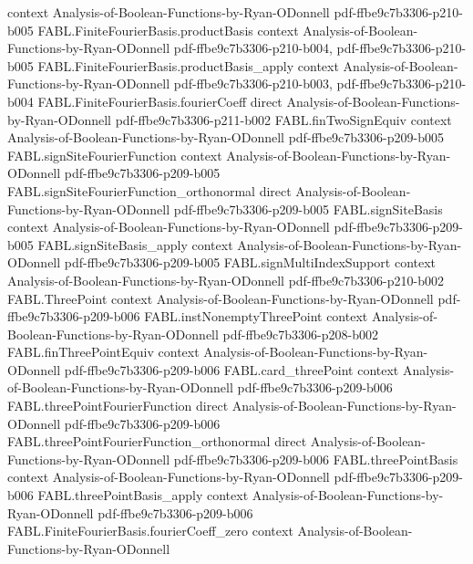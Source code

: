 \begin{theorem}
  {context}
  {Analysis-of-Boolean-Functions-by-Ryan-ODonnell}
  {pdf-ffbe9c7b3306-p210-b005}
\proofstep
  {FABL.FiniteFourierBasis.productBasis}
  {context}
  {Analysis-of-Boolean-Functions-by-Ryan-ODonnell}
  {pdf-ffbe9c7b3306-p210-b004,
    pdf-ffbe9c7b3306-p210-b005}
\proofstep
  {FABL.FiniteFourierBasis.productBasis_apply}
  {context}
  {Analysis-of-Boolean-Functions-by-Ryan-ODonnell}
  {pdf-ffbe9c7b3306-p210-b003,
    pdf-ffbe9c7b3306-p210-b004}
\proofstep
  {FABL.FiniteFourierBasis.fourierCoeff}
  {direct}
  {Analysis-of-Boolean-Functions-by-Ryan-ODonnell}
  {pdf-ffbe9c7b3306-p211-b002}
\proofstep
  {FABL.finTwoSignEquiv}
  {context}
  {Analysis-of-Boolean-Functions-by-Ryan-ODonnell}
  {pdf-ffbe9c7b3306-p209-b005}
\proofstep
  {FABL.signSiteFourierFunction}
  {context}
  {Analysis-of-Boolean-Functions-by-Ryan-ODonnell}
  {pdf-ffbe9c7b3306-p209-b005}
\proofstep
  {FABL.signSiteFourierFunction_orthonormal}
  {direct}
  {Analysis-of-Boolean-Functions-by-Ryan-ODonnell}
  {pdf-ffbe9c7b3306-p209-b005}
\proofstep
  {FABL.signSiteBasis}
  {context}
  {Analysis-of-Boolean-Functions-by-Ryan-ODonnell}
  {pdf-ffbe9c7b3306-p209-b005}
\proofstep
  {FABL.signSiteBasis_apply}
  {context}
  {Analysis-of-Boolean-Functions-by-Ryan-ODonnell}
  {pdf-ffbe9c7b3306-p209-b005}
\proofstep
  {FABL.signMultiIndexSupport}
  {context}
  {Analysis-of-Boolean-Functions-by-Ryan-ODonnell}
  {pdf-ffbe9c7b3306-p210-b002}
\proofstep
  {FABL.ThreePoint}
  {context}
  {Analysis-of-Boolean-Functions-by-Ryan-ODonnell}
  {pdf-ffbe9c7b3306-p209-b006}
\proofstep
  {FABL.instNonemptyThreePoint}
  {context}
  {Analysis-of-Boolean-Functions-by-Ryan-ODonnell}
  {pdf-ffbe9c7b3306-p208-b002}
\proofstep
  {FABL.finThreePointEquiv}
  {context}
  {Analysis-of-Boolean-Functions-by-Ryan-ODonnell}
  {pdf-ffbe9c7b3306-p209-b006}
\proofstep
  {FABL.card_threePoint}
  {context}
  {Analysis-of-Boolean-Functions-by-Ryan-ODonnell}
  {pdf-ffbe9c7b3306-p209-b006}
\proofstep
  {FABL.threePointFourierFunction}
  {direct}
  {Analysis-of-Boolean-Functions-by-Ryan-ODonnell}
  {pdf-ffbe9c7b3306-p209-b006}
\proofstep
  {FABL.threePointFourierFunction_orthonormal}
  {direct}
  {Analysis-of-Boolean-Functions-by-Ryan-ODonnell}
  {pdf-ffbe9c7b3306-p209-b006}
\proofstep
  {FABL.threePointBasis}
  {context}
  {Analysis-of-Boolean-Functions-by-Ryan-ODonnell}
  {pdf-ffbe9c7b3306-p209-b006}
\proofstep
  {FABL.threePointBasis_apply}
  {context}
  {Analysis-of-Boolean-Functions-by-Ryan-ODonnell}
  {pdf-ffbe9c7b3306-p209-b006}
\proofstep
  {FABL.FiniteFourierBasis.fourierCoeff_zero}
  {context}
  {Analysis-of-Boolean-Functions-by-Ryan-ODonnell}

\end{theorem}
